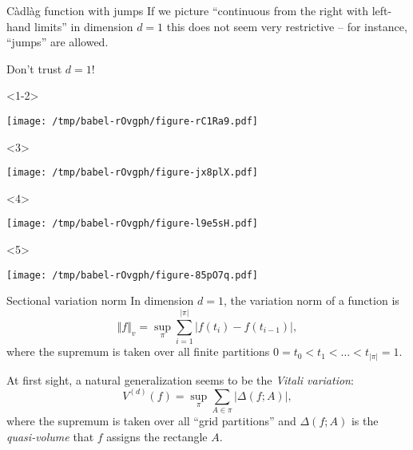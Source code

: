 \documentclass[smaller]{beamer}\usepackage{listings}
\begin{document}
\begin{frame}[label={sec:orgd3cc74f}]{Càdlàg function with jumps}
If we picture ``continuous from the right with left-hand limits'' in dimension
\(d=1\) this does not seem very restrictive -- for instance, ``jumps'' are allowed.\pause

\begin{alertblock}{\center Don't trust \(d=1\)!}
\end{alertblock}

\begin{onlyenv}<1-2>
\begin{center}
\texttt{[image: /tmp/babel-rOvgph/figure-rC1Ra9.pdf]}
\end{center}
\end{onlyenv}


\begin{onlyenv}<3>
\begin{center}
\texttt{[image: /tmp/babel-rOvgph/figure-jx8plX.pdf]}
\end{center}
\end{onlyenv}

\begin{onlyenv}<4>
\begin{center}
\texttt{[image: /tmp/babel-rOvgph/figure-l9e5sH.pdf]}
\end{center}
\end{onlyenv}

\begin{onlyenv}<5>
\begin{center}
\texttt{[image: /tmp/babel-rOvgph/figure-85pO7q.pdf]}
\end{center}
\end{onlyenv}
\end{frame}

\begin{frame}[label={sec:org00b8088}]{Sectional variation norm}
\pause
In dimension $d=1$, the variation norm of a function is
\begin{equation*}
  \Vert f \Vert_{v} = \sup_{\pi} \sum_{i=1}^{|\pi|} |f(t_{i})-f(t_{i-1})|,
\end{equation*}
where the supremum is taken over all finite partitions
\(0=t_0 < t_1 < \dots < t_{|\pi|} = 1\).

\vfill \pause

At first sight, a natural generalization seems to be the \emph{Vitali variation}:
\begin{equation*}
  V^{(d)}(f) = \sup_{\pi} \sum_{A \in \pi} | \Delta(f;A)|,
\end{equation*}
where the supremum is taken over all ``grid partitions'' and \(\Delta(f;A)\) is
the \textit{quasi-volume} that \(f\) assigns the rectangle $A$.
\end{frame}
\end{document}
